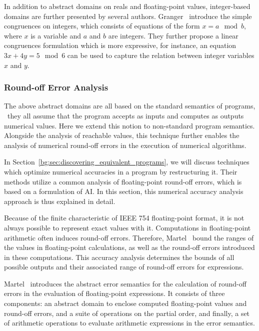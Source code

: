 In addition to abstract domains on reals and floating-point values,
integer-based domains are further presented by several authors.
Granger~\cite{granger89} introduce the simple congruences on integers, which
consists of equations of the form $x = a \mod b$, where $x$ is a variable
and $a$ and $b$ are integers.  They further propose a linear congruences
formulation which is more expressive, for instance, an equation $3 x + 4 y = 5
\mod 6$ can be used to capture the relation between integer variables $x$ and
$y$.

\subsubsection{Round-off Error Analysis}
\label{bg:ssub:accuracy}

The above abstract domains are all based on the standard semantics of programs,
\ie~they all assume that the program accepts as inputs and computes as
outputs numerical values.  Here we extend this notion to non-standard program
semantics.  Alongside the analysis of reachable values, this technique further
enables the analysis of numerical round-off errors in the execution of
numerical algorithms.

In Section~\ref{bg:sec:discovering_equivalent_programs}, we will discuss
techniques which optimize numerical accuracies in a program by restructuring
it.  Their methods utilize a common analysis of floating-point round-off
errors, which is based on a formulation of AI\@.  In this section, this
numerical accuracy analysis approach is thus explained in detail.

Because of the finite characteristic of IEEE 754 floating-point format, it
is not always possible to represent exact values with it.  Computations
in floating-point arithmetic often induces round-off errors.  Therefore,
Martel~\cite{martel07} bound the ranges of the values in floating-point
calculations, as well as the round-off errors introduced in these computations.
This accuracy analysis determines the bounds of all possible outputs and their
associated range of round-off errors for expressions.

Martel~\cite{martel07} introduces the abstract error semantics for the
calculation of round-off errors in the evaluation of floating-point
expressions.  It consists of three components: an abstract domain to enclose
computed floating-point values and round-off errors, and a suite of operations
on the partial order, and finally, a set of arithmetic operations to evaluate
arithmetic expressions in the error semantics.

